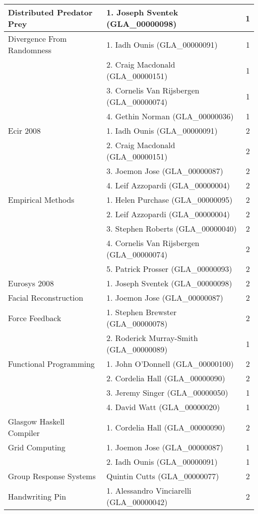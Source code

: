 \begin{longtable}{|l|l|c|}
\hline Distributed Predator Prey & 1. Joseph Sventek (GLA\_00000098) & 1 \\ 
\hline Divergence From Randomness & 1. Iadh Ounis (GLA\_00000091) & 1 \\ 
\hline  & 2. Craig Macdonald (GLA\_00000151) & 1 \\ 
\hline  & 3. Cornelis Van Rijsbergen (GLA\_00000074) & 1 \\ 
\hline  & 4. Gethin Norman (GLA\_00000036) & 1 \\ 
\hline Ecir 2008 & 1. Iadh Ounis (GLA\_00000091) & 2 \\ 
\hline  & 2. Craig Macdonald (GLA\_00000151) & 2 \\ 
\hline  & 3. Joemon Jose (GLA\_00000087) & 2 \\ 
\hline  & 4. Leif Azzopardi (GLA\_00000004) & 2 \\ 
\hline Empirical Methods & 1. Helen Purchase (GLA\_00000095) & 2 \\ 
\hline  & 2. Leif Azzopardi (GLA\_00000004) & 2 \\ 
\hline  & 3. Stephen Roberts (GLA\_00000040) & 2 \\ 
\hline  & 4. Cornelis Van Rijsbergen (GLA\_00000074) & 2 \\ 
\hline  & 5. Patrick Prosser (GLA\_00000093) & 2 \\ 
\hline Eurosys 2008 & 1. Joseph Sventek (GLA\_00000098) & 2 \\ 
\hline Facial Reconstruction & 1. Joemon Jose (GLA\_00000087) & 2 \\ 
\hline Force Feedback & 1. Stephen Brewster (GLA\_00000078) & 2 \\ 
\hline  & 2. Roderick Murray-Smith (GLA\_00000089) & 1 \\ 
\hline Functional Programming & 1. John O'Donnell (GLA\_00000100) & 2 \\ 
\hline  & 2. Cordelia Hall (GLA\_00000090) & 2 \\ 
\hline  & 3. Jeremy Singer (GLA\_00000050) & 1 \\ 
\hline  & 4. David Watt (GLA\_00000020) & 1 \\ 
\hline Glasgow Haskell Compiler & 1. Cordelia Hall (GLA\_00000090) & 2 \\ 
\hline Grid Computing & 1. Joemon Jose (GLA\_00000087) & 1 \\ 
\hline  & 2. Iadh Ounis (GLA\_00000091) & 1 \\ 
\hline Group Response Systems & Quintin Cutts (GLA\_00000077) & 2 \\ 
\hline Handwriting Pin & 1. Alessandro Vinciarelli (GLA\_00000042) & 2 \\ 

\end{longtable}
